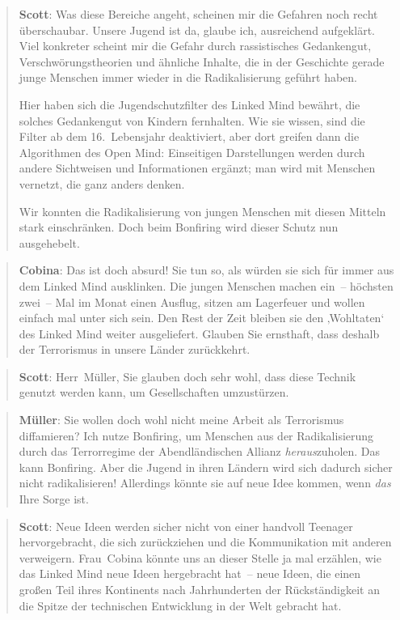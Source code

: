 \documentclass{scrartcl}
\newenvironment{antworta}{
  \begin{quotation}
  }{
  \end{quotation}
}
\newenvironment{antwortb}{
  \begin{quotation}
  }{
  \end{quotation}
}
\newcommand{\name}[1]{\textbf{#1}}
\begin{document}
\begin{antworta}
\name{Scott}: Was diese Bereiche angeht, scheinen mir die
    Gefahren noch recht überschaubar. Unsere Jugend ist da,
    glaube ich, ausreichend aufgeklärt. Viel konkreter
    scheint mir die Gefahr durch rassistisches Gedankengut,
    Verschwörungstheorien und ähnliche Inhalte, die in der
    Geschichte gerade junge Menschen immer wieder in die
    Radikalisierung geführt haben.

Hier haben sich die Jugendschutzfilter des Linked Mind
  bewährt, die solches Gedankengut von Kindern
  fernhalten. Wie sie wissen, sind die Filter ab dem
  16.~Lebensjahr deaktiviert, aber dort greifen dann die
  Algorithmen des Open Mind: Einseitigen Darstellungen
  werden durch andere Sichtweisen und Informationen ergänzt;
  man wird mit Menschen vernetzt, die ganz anders denken.

Wir konnten die Radikalisierung von jungen Menschen mit
  diesen Mitteln stark einschränken. Doch beim Bonfiring
  wird dieser Schutz nun ausgehebelt.
\end{antworta}


\begin{antwortb}
\name{Cobina}: Das ist doch absurd! Sie tun so, als würden sie sich
für immer aus dem Linked Mind ausklinken. Die jungen
Menschen machen ein~– höchsten zwei~– Mal im Monat einen
Ausflug, sitzen am Lagerfeuer und wollen einfach mal unter
sich sein. Den Rest der Zeit bleiben sie den ‚Wohltaten‘ des
Linked Mind weiter ausgeliefert. Glauben Sie ernsthaft, dass
deshalb der Terrorismus in unsere Länder zurückkehrt.
\end{antwortb}


\begin{antworta}
\name{Scott}: Herr~Müller, Sie glauben doch sehr wohl, dass diese
Technik genutzt werden kann, um Gesellschaften umzustürzen.
\end{antworta}


\begin{antwortb}
\name{Müller}: Sie wollen doch wohl nicht meine Arbeit als
Terrorismus diffamieren? Ich nutze Bonfiring, um Menschen
aus der Radikalisierung durch das Terrorregime der
Abendländischen Allianz \emph{heraus}zuholen. Das kann
Bonfiring. Aber die Jugend in ihren Ländern wird sich
dadurch sicher nicht radikalisieren! Allerdings könnte sie
auf neue Idee kommen, wenn \emph{das} Ihre Sorge ist.
\end{antwortb}


\begin{antworta}
\name{Scott}: Neue Ideen werden sicher nicht von einer handvoll
Teenager hervorgebracht, die sich zurückziehen und die
Kommunikation mit anderen verweigern. Frau~Cobina könnte uns
an dieser Stelle ja mal erzählen, wie das Linked Mind neue
Ideen hergebracht hat~– neue Ideen, die einen großen Teil
ihres Kontinents nach Jahrhunderten der Rückständigkeit an
die Spitze der technischen Entwicklung in der Welt gebracht
hat.
\end{antworta}
\end{document}

